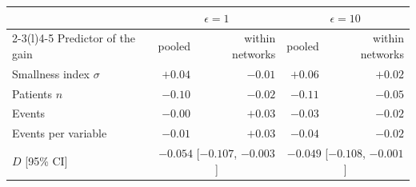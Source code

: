 \begin{tabular}{@{}lrrrr@{}}
\toprule
 & \multicolumn{2}{c}{$\epsilon=1$} & \multicolumn{2}{c}{$\epsilon=10$}\\
\cmidrule(lr){2-3}\cmidrule(l){4-5}
Predictor of the gain & pooled & within networks & pooled & within networks\\
\midrule
Smallness index $\sigma$ & $+0.04$ & $-0.01$ & $+0.06$ & $+0.02$\\
Patients $n$ & $-0.10$ & $-0.02$ & $-0.11$ & $-0.05$\\
Events & $-0.00$ & $+0.03$ & $-0.03$ & $-0.02$\\
Events per variable & $-0.01$ & $+0.03$ & $-0.04$ & $-0.02$\\
\midrule
$D$ [95\% CI] & \multicolumn{2}{c}{$-0.054$ [$-0.107$, $-0.003$]} & \multicolumn{2}{c}{$-0.049$ [$-0.108$, $-0.001$]}\\
\bottomrule
\end{tabular}
